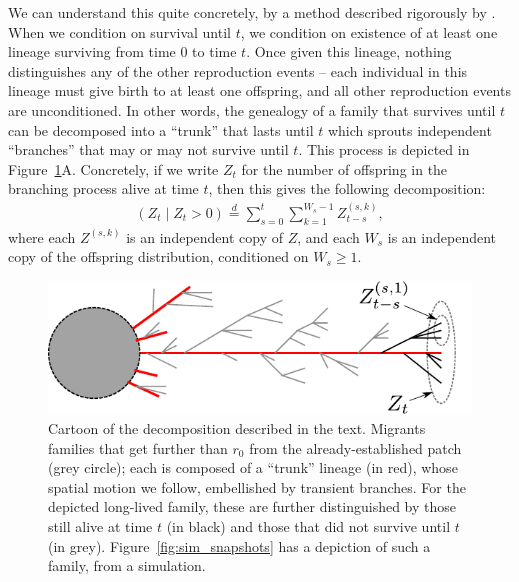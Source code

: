 \documentclass{article}
\renewcommand{\P}{\mathbb{P}}
\newcommand{\deq}{\stackrel{\scriptscriptstyle{d}}{=}}
\begin{document}
We can understand this quite concretely, by a method described rigorously by \citet{geiger1999elementary} \citep[see also][]{chauvin1991growing}.
When we condition on survival until $t$, we condition on existence of at least one lineage surviving from time $0$ to time $t$.
Once given this lineage, nothing distinguishes any of the other reproduction events --
each individual in this lineage must give birth to at least one offspring,
and all other reproduction events are unconditioned.
In other words, the genealogy of a family that survives until $t$
can be decomposed into a ``trunk'' that lasts until $t$
which sprouts independent ``branches'' that may or may not survive until $t$.
This process is depicted in Figure~\ref{fig:branching_decomp}A.
Concretely, if we write $Z_t$ for the number of offspring in the branching process alive at time $t$,
then this gives the following decomposition:
\begin{align}
  \left( Z_t \; \vert \; Z_t>0 \right) \deq \sum_{s=0}^t \sum_{k=1}^{W_s-1} Z^{(s,k)}_{t-s},
\end{align}
where each $Z^{(s,k)}$ is an independent copy of $Z$,
and each $W_s$ is an independent copy of the offspring distribution, conditioned on $W_s \ge 1$.

\begin{figure}[ht!!]
  \begin{center}
    \includegraphics{branching-concept}
  \end{center}
\caption{Cartoon of the decomposition described in the text.
Migrants families that get further than $r_0$ from the already-established patch (grey circle);
each is composed of a ``trunk'' lineage (in red), whose spatial motion we follow,
embellished by transient branches.
For the depicted long-lived family, these are further distinguished by those still alive at time $t$ (in black)
and those that did not survive until $t$ (in grey).
Figure~\ref{fig:sim_snapshots} has a depiction of such a family, from a simulation.
\label{fig:branching_decomp}
}
\end{figure}
\end{document}
